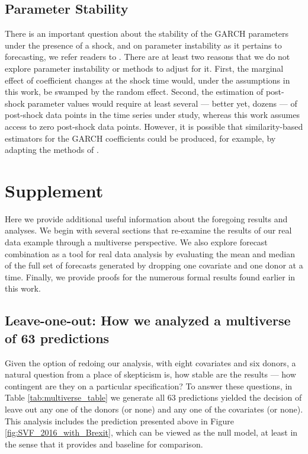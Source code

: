 \documentclass{uiucthesis2021}
\theoremstyle{definition}
\begin{document}
\subsection{Parameter Stability}

There is an important question about the stability of the GARCH parameters under the presence of a shock, and on parameter instability as it pertains to forecasting, we refer readers to \cite[][]{rossi2013advances, rossi2021forecasting}.  There are at least two reasons that we do not explore parameter instability or methods to adjust for it.  First, the marginal effect of coefficient changes at the shock time would, under the assumptions in this work, be swamped by the random effect.  Second, the estimation of post-shock parameter values would require at least several --- better yet, dozens --- of post-shock data points in the time series under study, whereas this work assumes access to zero post-shock data points.  However, it is possible that similarity-based estimators for the GARCH coefficients could be produced, for example, by adapting the methods of \cite[][]{dendramis2020similarity}.

\section{Supplement}

Here we provide additional useful information about the foregoing results and analyses.  We begin with several sections that re-examine the results of our real data example through a multiverse perspective.  We also explore forecast combination as a tool for real data analysis by evaluating the mean and median of the full set of forecasts generated by dropping one covariate and one donor at a time.  Finally, we provide proofs for the numerous formal results found earlier in this work.

\subsection{Leave-one-out: How we analyzed a multiverse of 63 predictions}

Given the option of redoing our analysis, with eight covariates and six donors, a natural question from a place of skepticism is, how stable are the results --- how contingent are they on a particular specification?  To answer these questions, in Table \ref{tab:multiverse_table} we generate all 63 predictions yielded the decision of leave out any one of the donors (or none) and any one of the covariates (or none).  This analysis includes the prediction presented above in Figure \ref{fig:SVF_2016_with_Brexit}, which can be viewed as the null model, at least in the sense that it provides and baseline for comparison. 
 
\end{document}
